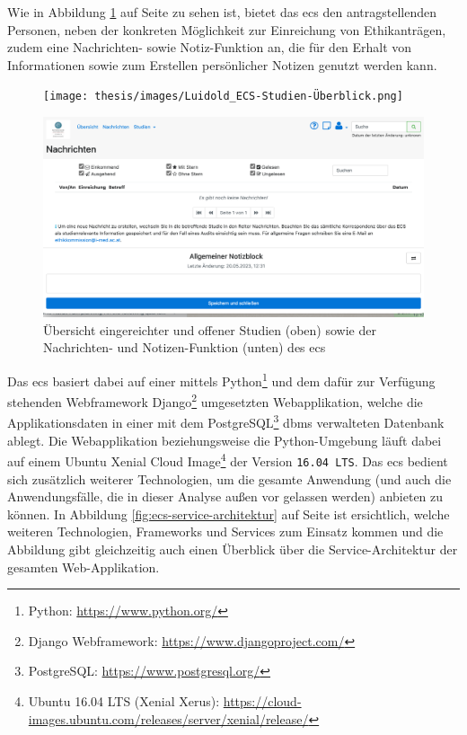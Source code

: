 \documentclass[a4paper,12pt,twoside,numbers=noendperiod]{scrreprt}
\begin{document}
Wie in Abbildung \ref{fig:ecs-studien-nachrichten-notizen} auf Seite \pageref{fig:ecs-studien-nachrichten-notizen} zu sehen ist, bietet das \ac{ecs} den antragstellenden Personen, neben der konkreten Möglichkeit zur Einreichung von Ethikanträgen, zudem eine Nachrichten- sowie Notiz-Funktion an, die für den Erhalt von Informationen sowie zum Erstellen persönlicher Notizen genutzt werden kann.

\begin{figure}[ht!]
    \centering
    \begin{minipage}[t]{.85\linewidth}
        \texttt{[image: thesis/images/Luidold\_ECS-Studien-Überblick.png]}
    \end{minipage}
    \begin{minipage}[b]{.85\linewidth}
        \includegraphics[width=\linewidth]{thesis/images/Luidold_ECS-Nachrichten-Notizen.png}
    \end{minipage}
    \caption[Übersicht eingereichter und offener Studien sowie der Nachrichten- und Notizen-Funktion des \acl{ecs}]{Übersicht eingereichter und offener Studien (oben) sowie der Nachrichten- und Notizen-Funktion (unten) des \acl{ecs} \cite{ethikkommission_der_medizinischen_universitat_innsbruck_ethikkommission_2023}}
    \label{fig:ecs-studien-nachrichten-notizen}
\end{figure}

Das \acl{ecs} basiert dabei auf einer mittels Python\footnote{Python: \url{https://www.python.org/}} und dem dafür zur Verfügung stehenden Webframework Django\footnote{Django Webframework: \url{https://www.djangoproject.com/}} umgesetzten Webapplikation, welche die Applikationsdaten in einer mit dem PostgreSQL\footnote{PostgreSQL: \url{https://www.postgresql.org/}} \ac{dbms} verwalteten Datenbank ablegt. Die Webapplikation beziehungsweise die Python-Umgebung läuft dabei auf einem Ubuntu Xenial Cloud Image\footnote{Ubuntu 16.04 LTS (Xenial Xerus): \url{https://cloud-images.ubuntu.com/releases/server/xenial/release/}} der Version \texttt{16.04 LTS}. Das \ac{ecs} bedient sich zusätzlich weiterer Technologien, um die gesamte Anwendung (und auch die Anwendungsfälle, die in dieser Analyse außen vor gelassen werden) anbieten zu können. In Abbildung \ref{fig:ecs-service-architektur} auf Seite \pageref{fig:ecs-service-architektur} ist ersichtlich, welche weiteren Technologien, Frameworks und Services zum Einsatz kommen und die Abbildung gibt gleichzeitig auch einen Überblick über die Service-Architektur der gesamten Web-Applikation. \cite{medizinische_universitat_wien_ecs-docs_about-2021, medizinische_universitat_wien_ecs-handbook_development-2021}
\end{document}
